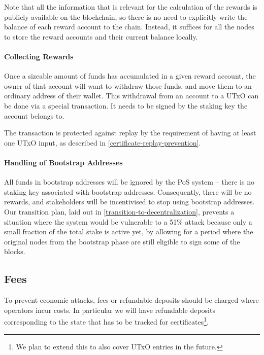\documentclass[11pt,a4paper,dvipsnames,twosided]{article}
\begin{document}
Note that all the information that is relevant for the calculation of
the rewards is publicly available on the blockchain, so there is no
need to explicitly write the balance of each reward account to the
chain. Instead, it suffices for all the nodes to store the reward
accounts and their current balance locally.

\paragraph{Collecting Rewards}

Once a sizeable amount of funds has accumulated in a given reward
account, the owner of that account will want to withdraw those funds,
and move them to an ordinary address of their wallet. This withdrawal
from an account to a UTxO can be done via a special transaction. It
needs to be signed by the staking key the account belongs to.

The transaction is protected against replay by the requirement of having at
least one UTxO input, as described in \cref{certificate-replay-prevention}.

\paragraph{Handling of Bootstrap Addresses}
\label{handling-of-bootstrap-addresses}

All funds in bootstrap addresses will be ignored by the PoS system --
there is no staking key associated with bootstrap
addresses. Consequently, there will be no rewards, and stakeholders
will be incentivised to stop using bootstrap addresses. Our transition
plan, laid out in \cref{transition-to-decentralization}, prevents a
situation where the system would be vulnerable to a 51\% attack
because only a small fraction of the total stake is active yet, by
allowing for a period where the original nodes from the bootstrap
phase are still eligible to sign some of the blocks.

\subsection{Fees}
\label{fees}

To prevent economic attacks, fees or refundable deposits should be
charged where operators incur costs. In particular we will have
refundable deposits corresponding to the state that has to be tracked
for certificates\footnote{We plan to extend this to also cover UTxO entries in
  the future.}.
\end{document}

